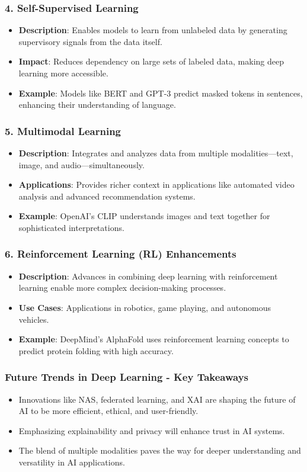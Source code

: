\documentclass[aspectratio=169]{beamer}
\begin{document}
\begin{frame}[fragile]
    \frametitle{4. Self-Supervised Learning}
    \begin{itemize}
        \item \textbf{Description}: Enables models to learn from unlabeled data by generating supervisory signals from the data itself.
        \item \textbf{Impact}: Reduces dependency on large sets of labeled data, making deep learning more accessible.
        \item \textbf{Example}: Models like BERT and GPT-3 predict masked tokens in sentences, enhancing their understanding of language.
    \end{itemize}
\end{frame}

\begin{frame}[fragile]
    \frametitle{5. Multimodal Learning}
    \begin{itemize}
        \item \textbf{Description}: Integrates and analyzes data from multiple modalities—text, image, and audio—simultaneously.
        \item \textbf{Applications}: Provides richer context in applications like automated video analysis and advanced recommendation systems.
        \item \textbf{Example}: OpenAI’s CLIP understands images and text together for sophisticated interpretations.
    \end{itemize}
\end{frame}

\begin{frame}[fragile]
    \frametitle{6. Reinforcement Learning (RL) Enhancements}
    \begin{itemize}
        \item \textbf{Description}: Advances in combining deep learning with reinforcement learning enable more complex decision-making processes.
        \item \textbf{Use Cases}: Applications in robotics, game playing, and autonomous vehicles.
        \item \textbf{Example}: DeepMind’s AlphaFold uses reinforcement learning concepts to predict protein folding with high accuracy.
    \end{itemize}
\end{frame}

\begin{frame}[fragile]
    \frametitle{Future Trends in Deep Learning - Key Takeaways}
    \begin{itemize}
        \item Innovations like NAS, federated learning, and XAI are shaping the future of AI to be more efficient, ethical, and user-friendly.
        \item Emphasizing explainability and privacy will enhance trust in AI systems.
        \item The blend of multiple modalities paves the way for deeper understanding and versatility in AI applications.
    \end{itemize}
\end{frame}
\end{document}
